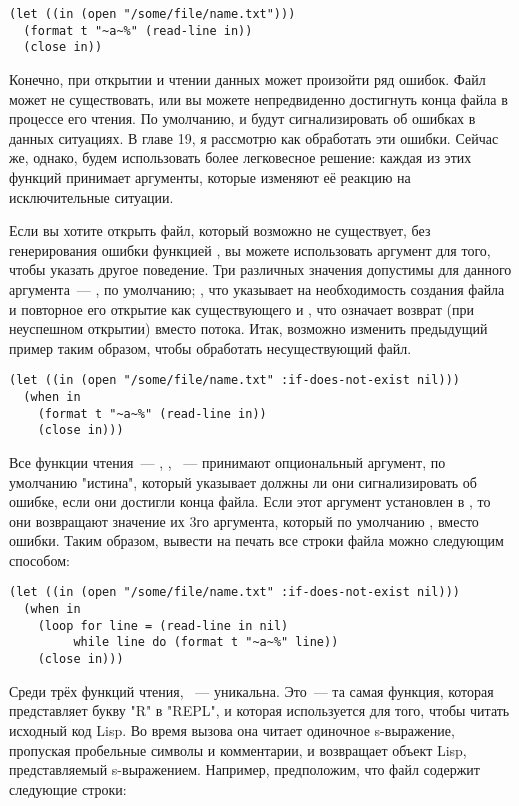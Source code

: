 \begin{lstlisting}
(let ((in (open "/some/file/name.txt")))
  (format t "~a~%" (read-line in))
  (close in))
\end{lstlisting}

Конечно, при открытии и чтении данных может произойти ряд ошибок. Файл может не
существовать, или вы можете непредвиденно достигнуть конца файла в процессе его чтения. По
умолчанию,  и  будут сигнализировать об ошибках в данных
ситуациях. В главе 19, я рассмотрю как обработать эти ошибки. Сейчас же, однако, будем
использовать более легковесное решение: каждая из этих функций принимает аргументы,
которые изменяют её реакцию на исключительные ситуации.

Если вы хотите открыть файл, который возможно не существует, без генерирования ошибки
функцией , вы можете использовать аргумент  для того,
чтобы указать другое поведение. Три различных значения допустимы для данного аргумента~---
, по умолчанию; , что указывает на необходимость создания файла
и повторное его открытие как существующего и , что означает возврат 
(при неуспешном открытии) вместо потока. Итак, возможно изменить предыдущий пример таким
образом, чтобы обработать несуществующий файл.

\begin{lstlisting}
(let ((in (open "/some/file/name.txt" :if-does-not-exist nil)))
  (when in
    (format t "~a~%" (read-line in))
    (close in)))
\end{lstlisting}

Все функции чтения~--- , , ~--- принимают
опциональный аргумент, по умолчанию "истина", который указывает должны ли они
сигнализировать об ошибке, если они достигли конца файла. Если этот аргумент установлен в
, то они возвращают значение их 3го аргумента, который по умолчанию ,
вместо ошибки. Таким образом, вывести на печать все строки файла можно следующим способом:

\begin{lstlisting}
(let ((in (open "/some/file/name.txt" :if-does-not-exist nil)))
  (when in
    (loop for line = (read-line in nil)
         while line do (format t "~a~%" line))
    (close in)))
\end{lstlisting}

Среди трёх функций чтения, ~--- уникальна. Это~--- та самая функция, которая
представляет букву "R" в "REPL", и которая используется для того, чтобы читать исходный
код Lisp. Во время вызова она читает одиночное s-выражение, пропуская пробельные символы и
комментарии, и возвращает объект Lisp, представляемый s-выражением. Например, предположим,
что файл  содержит следующие строки:

